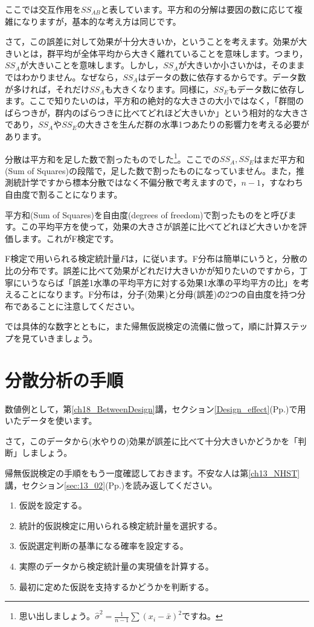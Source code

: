 \documentclass{ltjbook}
\begin{document}
ここでは交互作用を$SS_{AB}$と表しています。平方和の分解は要因の数に応じて複雑になりますが，基本的な考え方は同じです。

さて，この誤差に対して効果が十分大きいか，ということを考えます。効果が大きいとは，群平均が全体平均から大きく離れていることを意味します。つまり，$SS_A$が大きいことを意味します。しかし，$SS_A$が大きいか小さいかは，そのままではわかりません。なぜなら，$SS_A$はデータの数に依存するからです。データ数が多ければ，それだけ$SS_A$も大きくなります。同様に，$SS_E$もデータ数に依存します。ここで知りたいのは，平方和の絶対的な大きさの大小ではなく，「群間のばらつきが，群内のばらつきに比べてどれほど大きいか」という相対的な大きさであり，$SS_A$や$SS_E$の大きさを生んだ群の水準1つあたりの影響力を考える必要があります。

分散は平方和を足した数で割ったものでした\footnote{思い出しましょう。$\hat{\sigma}^2 = \frac{1}{n-1}\sum (x_i - \bar{x})^2$ですね。}。ここでの$SS_A,SS_E$はまだ平方和(Sum of Squares)の段階で，足した数で割ったものになっていません。また，推測統計学ですから標本分散ではなく不偏分散で考えますので，$n-1$，すなわち自由度で割ることになります。

平方和(Sum of Squares)を自由度(degrees of freedom)で割ったものをと呼びます。この平均平方を使って，効果の大きさが誤差に比べてどれほど大きいかを評価します。これがF検定です。

F検定で用いられる検定統計量$F$は，に従います。F分布は簡単にいうと，分散の比の分布です。誤差に比べて効果がどれだけ大きいかが知りたいのですから，丁寧にいうならば「誤差1水準の平均平方に対する効果1水準の平均平方の比」を考えることになります。F分布は，分子(効果)と分母(誤差)の2つの自由度を持つ分布であることに注意してください。

では具体的な数字とともに，また帰無仮説検定の流儀に倣って，順に計算ステップを見ていきましょう。

\section{分散分析の手順}
数値例として，第\ref{ch18_BetweenDesign}講，セクション\ref{Design_effect}(Pp.\pageref{Design_effect})で用いたデータを使います。

さて，このデータから(水やりの)効果が誤差に比べて十分大きいかどうかを「判断」しましょう。

帰無仮説検定の手順をもう一度確認しておきます。不安な人は第\ref{ch13_NHST}講，セクション\ref{sec:13_02}(Pp.\pageref{sec:13_02})を読み返してください。
\begin{enumerate}
	\item 仮説を設定する。
	\item 統計的仮説検定に用いられる検定統計量を選択する。
	\item 仮説選定判断の基準になる確率を設定する。
	\item 実際のデータから検定統計量の実現値を計算する。
	\item 最初に定めた仮説を支持するかどうかを判断する。
\end{enumerate}
\end{document}
